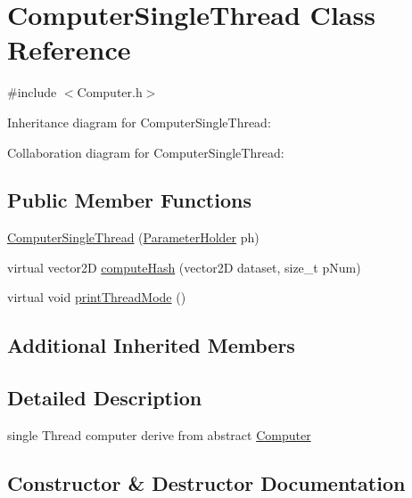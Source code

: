 \hypertarget{classComputerSingleThread}{}\section{Computer\+Single\+Thread Class Reference}
\label{classComputerSingleThread}


{\ttfamily \#include $<$Computer.\+h$>$}



Inheritance diagram for Computer\+Single\+Thread\+:


Collaboration diagram for Computer\+Single\+Thread\+:
\subsection*{Public Member Functions}
\begin{DoxyCompactItemize}
\item 
\hyperlink{classComputerSingleThread_a1caad58f9f7e25f4a95a8780583778fd}{Computer\+Single\+Thread} (\hyperlink{structParameterHolder}{Parameter\+Holder} ph)
\item 
virtual vector2D \hyperlink{classComputerSingleThread_a38011044755e69be79aac0972bce50a3}{compute\+Hash} (vector2D dataset, size\+\_\+t p\+Num)
\item 
virtual void \hyperlink{classComputerSingleThread_ac5ea29a004e96fa74c7c4994c67136ef}{print\+Thread\+Mode} ()
\end{DoxyCompactItemize}
\subsection*{Additional Inherited Members}


\subsection{Detailed Description}
single Thread computer derive from abstract \hyperlink{classComputer}{Computer} 

\subsection{Constructor \& Destructor Documentation}
